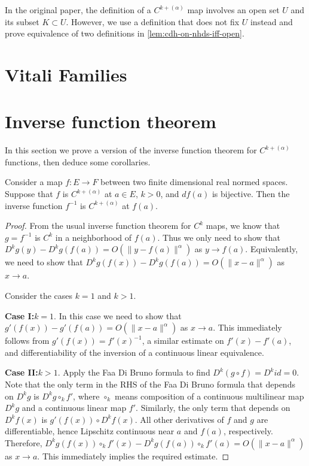 \begin{remark}
  In the original paper, the definition of a \(C^{k+(\alpha)}\) map
  involves an open set \(U\) and its subset \(K\subset U\).
  However, we use a definition that does not fix \(U\) instead
  and prove equivalence of two definitions in \autoref{lem:cdh-on-nhds-iff-open}.
\end{remark}

\section{Vitali Families}%
\label{sec:vitali-families}

\section{Inverse function theorem}%
\label{sec:inverse-funct-theor}

In this section we prove a version of the inverse function theorem for \(C^{k+(\alpha)}\) functions,
then deduce some corollaries.

\begin{theorem}%
  \label{thm:cdh-at-inverse}
  Consider a map \(f\colon E\to F\) between two finite dimensional real normed spaces.
  Suppose that \(f\) is \(C^{k+(\alpha)}\) at \(a \in E\), \(k > 0\), and \(df(a)\) is bijective.
  Then the inverse function \(f^{-1}\) is \(C^{k+(\alpha)}\) at \(f(a)\).
\end{theorem}
\begin{proof}
  From the usual inverse function theorem for \(C^{k}\) maps,
  we know that \(g=f^{-1}\) is \(C^{k}\) in a neighborhood of \(f(a)\).
  Thus we only need to show that \(D^{k}g(y)-D^{k}g(f(a)) = O\left(\|y - f(a)\|^{\alpha}\right)\) as \(y \to f(a)\).
  Equivalently, we need to show that \(D^{k}g(f(x)) - D^{k}g(f(a)) = O\left(\|x - a\|^{\alpha}\right)\) as \(x\to a\).

  Consider the cases \(k = 1\) and \(k > 1\).

  \textbf{Case I:\@\(k = 1\)}. In this case we need to show that
  \(g'(f(x)) - g'(f(a)) = O\left(\|x - a\|^{\alpha}\right)\) as \(x\to a\).
  This immediately follows from \(g'(f(x)) = {f'(x)}^{-1}\),
  a similar estimate on \(f'(x) - f'(a)\),
  and differentiability of the inversion of a continuous linear equivalence.

  \textbf{Case II:\@\(k > 1\)}.
  Apply the Faa Di Bruno formula to find \(D^{k}(g \circ f) = D^{k} id =0\).
  Note that the only term in the RHS of the Faa Di Bruno formula
  that depends on \(D^{k}g\) is \(D^{k}g\circ_{k} f'\),
  where \(\circ_{k}\) means composition of a continuous multilinear map \(D^{k}g\)
  and a continuous linear map \(f'\).
  Similarly, the only term that depends on \(D^{k}f(x)\) is \(g'(f(x))\circ D^{k}f(x)\).
  All other derivatives of \(f\) and \(g\) are differentiable,
  hence Lipschitz continuous near \(a\) and \(f(a)\), respectively.
  Therefore, \(D^{k}g(f(x))\circ_{k}f'(x) - D^{k}g(f(a))\circ_{k}f'(a)=O\left(\|x - a\|^{\alpha}\right)\) as \(x\to a\).
  This immediately implies the required estimate.
\end{proof}

